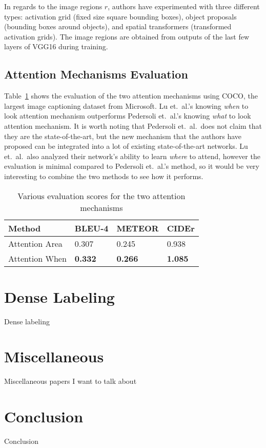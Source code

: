 \documentclass[10pt,twocolumn,letterpaper]{article}
\newcommand{\tabref}[1]{Table~\ref{tab:#1}}
\begin{document}
In regards to the image regions $r$, authors have experimented with three
different types: activation grid (fixed size square bounding boxes), object
proposals (bounding boxes around objects), and spatial transformers
(transformed activation grids). The image regions are obtained from outputs of
the last few layers of VGG16 during training.

\subsection{Attention Mechanisms Evaluation}
\tabref{attention} shows the evaluation of the two attention mechanisms using
COCO, the largest image captioning dataset from Microsoft. Lu et.\ al.'s
knowing \textit{when} to look attention mechanism outperforms Pedersoli et.\
al.'s knowing \textit{what} to look attention mechanism. It is worth noting
that Pedersoli et.\ al.\ does not claim that they are the state-of-the-art,
but the new mechanism that the authors have proposed can be integrated into a
lot of existing state-of-the-art networks. Lu et.\ al.\ also analyzed their
network's ability to learn \textit{where} to attend, however the evaluation is
minimal compared to Pedersoli et.\ al.'s method, so it would be very
interesting to combine the two methods to see how it performs.
%
\begin{table}[]
\centering
\caption{Various evaluation scores for the two attention mechanisms}
\label{tab:attention}
\begin{tabular}{llll}
	\toprule
	Method         & BLEU-4         & METEOR         & CIDEr          \\
	\hline
	Attention Area & 0.307          & 0.245          & 0.938          \\
	Attention When & \textbf{0.332} & \textbf{0.266} & \textbf{1.085} \\
	\bottomrule
\end{tabular}
\end{table}
%
\section{Dense Labeling}

Dense labeling

\section{Miscellaneous}

Miscellaneous papers I want to talk about

\section{Conclusion}

Conclusion

{\small


}
\end{document}
